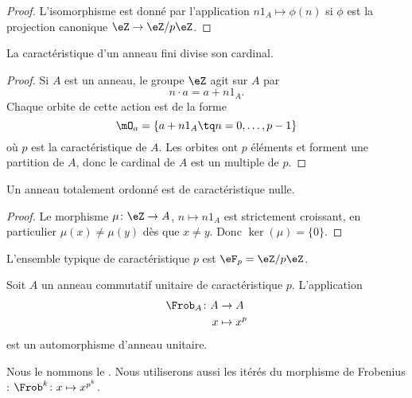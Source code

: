 \begin{proof}
	L'isomorphisme est donné par l'application \( n1_A\mapsto \phi(n)\) si \( \phi\) est la projection canonique \( \eZ\to \eZ/p\eZ\).
\end{proof}

\begin{proposition}     \label{PropGExaUK}
	La caractéristique d'un anneau fini divise son cardinal.
\end{proposition}

\begin{proof}
	Si \( A\) est un anneau, le groupe \( \eZ\) agit sur \( A\) par
	\begin{equation}
		n\cdot a=a+n1_A.
	\end{equation}
	Chaque orbite de cette action est de la forme
	\begin{equation}
		\mO_a=\{ a+n1_A\tq n=0,\ldots, p-1 \}
	\end{equation}
	où \( p\) est la caractéristique de \( A\). Les orbites ont \( p\) éléments et forment une partition de \( A\), donc le cardinal de \( A\) est un multiple de \( p\).
\end{proof}

\begin{lemma}        \label{LEMooJQIKooQgukqn}
	Un anneau totalement ordonné est de caractéristique nulle.
\end{lemma}

\begin{proof}
	Le morphisme \( \mu\colon \eZ\to A\), \( n\mapsto n 1_A\) est strictement croissant, en particulier \( \mu(x)\neq \mu(y)\) dès que \( x\neq y\). Donc \( \ker(\mu)=\{ 0 \}\).
\end{proof}

L'ensemble typique de caractéristique \( p\) est \( \eF_p=\eZ/p\eZ\).

\begin{proposition} \label{PropFrobHAMkTY}
	Soit \( A\) un anneau commutatif unitaire de caractéristique \( p\). L'application
	\begin{equation}
		\begin{aligned}
			\Frob_A\colon A & \to A       \\
			x               & \mapsto x^p
		\end{aligned}
	\end{equation}
	est un automorphisme d'anneau unitaire.
\end{proposition}
Nous le nommons le . Nous utiliserons aussi les itérés du morphisme de Frobenius : \( \Frob^k\colon x\mapsto x^{p^k}\).

